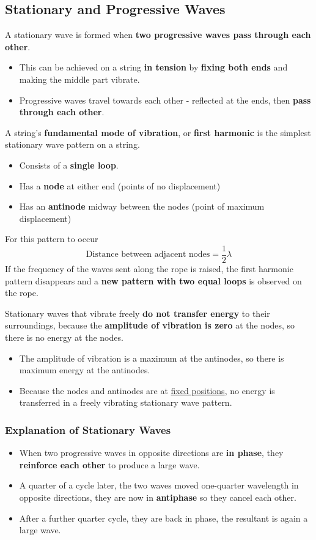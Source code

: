 \subsection{Stationary and Progressive Waves}

A stationary wave is formed when \textbf{two progressive waves pass through each other}. 
\begin{itemize}
    \item This can be achieved on a string \textbf{in tension} by \textbf{fixing both ends} and making the middle part vibrate.
    \item Progressive waves travel towards each other - reflected at the ends, then \textbf{pass through each other}.
\end{itemize}

A string's \textbf{fundamental mode of vibration}, or \textbf{first harmonic} is the simplest stationary wave pattern on a string.
\begin{itemize}
    \item Consists of a \textbf{single loop}.
    \item Has a \textbf{node} at either end (points of no displacement)
    \item Has an \textbf{antinode} midway between the nodes (point of maximum displacement)
\end{itemize}

For this pattern to occur
$$\text{Distance between adjacent nodes}=\frac{1}{2}\lambda$$
If the frequency of the waves sent along the rope is raised, the first harmonic pattern disappears and a \textbf{new pattern with two equal loops} is observed on the rope.

Stationary waves that vibrate freely \textbf{do not transfer energy} to their surroundings, because the \textbf{amplitude of vibration is zero} at the nodes, so there is no energy at the nodes.
\begin{itemize}
    \item The amplitude of vibration is a maximum at the antinodes, so there is maximum energy at the antinodes.
    \item Because the nodes and antinodes are at \underline{fixed positions}, no energy is transferred in a freely vibrating stationary wave pattern.
\end{itemize}

\subsubsection*{Explanation of Stationary Waves}
\begin{itemize}
    \item When two progressive waves in opposite directions are \textbf{in phase}, they \textbf{reinforce each other} to produce a large wave.
    \item A quarter of a cycle later, the two waves moved one-quarter wavelength in opposite directions, they are now in \textbf{antiphase} so they cancel each other.
    \item After a further quarter cycle, they are back in phase, the resultant is again a large wave.
\end{itemize}


